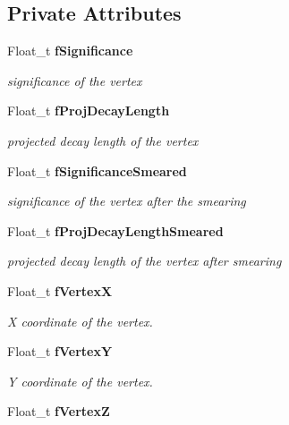 \subsection*{Private Attributes}
\begin{CompactItemize}
\item 
Float\_\-t \bf{f\-Significance}\label{classTVertex_4ee0371ab0fed7f2e5db0f4c3d1943a8}

\begin{CompactList}\small\item\em significance of the vertex \item\end{CompactList}\item 
Float\_\-t \bf{f\-Proj\-Decay\-Length}\label{classTVertex_ec3cfaf6d692894a5c32c8c6f3910a30}

\begin{CompactList}\small\item\em projected decay length of the vertex \item\end{CompactList}\item 
Float\_\-t \bf{f\-Significance\-Smeared}\label{classTVertex_05bc5b68cf637633460db952db2add97}

\begin{CompactList}\small\item\em significance of the vertex after the smearing \item\end{CompactList}\item 
Float\_\-t \bf{f\-Proj\-Decay\-Length\-Smeared}\label{classTVertex_107d54a1efeaec72b60c968cda307b68}

\begin{CompactList}\small\item\em projected decay length of the vertex after smearing \item\end{CompactList}\item 
Float\_\-t \bf{f\-Vertex\-X}\label{classTVertex_1b9d4292cc6634c40bd75771403273fa}

\begin{CompactList}\small\item\em X coordinate of the vertex. \item\end{CompactList}\item 
Float\_\-t \bf{f\-Vertex\-Y}\label{classTVertex_a9983a42727ce998dc121f2842e5a3f5}

\begin{CompactList}\small\item\em Y coordinate of the vertex. \item\end{CompactList}\item 
Float\_\-t \bf{f\-Vertex\-Z}\label{classTVertex_3f5c1448760204b5887a64a3d59f2a82}


\end{CompactItemize}
